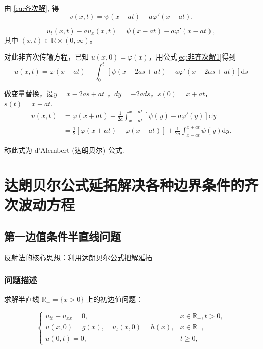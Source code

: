 \documentclass[12pt,a4paper]{article}
\numberwithin{subsection}{section}   %
\numberwithin{subsubsection}{subsection}
\theoremstyle{plain}
\theoremstyle{definition}
\theoremstyle{remark}
\theoremstyle{remark}
\begin{document}
	由 \eqref{eq:齐次解}, 得
	\begin{equation}
		v(x, t) = \psi(x - a t) - a \varphi'(x - a t).
	\end{equation}
	
	\begin{equation}
		u_t(x, t) - a u_x(x, t) = \psi(x - a t) - a \varphi'(x - a t),
	\end{equation}
	其中 \((x, t) \in \mathbb{R} \times (0, \infty)\)。
	
	对此非齐次传输方程，已知 \(u(x, 0) = \varphi(x)\)，用公式\eqref{eq:非齐次解1}得到
	\begin{equation}
			u(x, t) = \varphi(x + a t) + \int_0^t \left[ \psi(x - 2 a s + a t) - a \varphi'(x - 2 a s + a t) \right] \mathrm{d}s 
	\end{equation}
	
	
做变量替换，设$y=x−2as+at$	，$dy=−2ads$，$s(0)=x+at$，$s(t)=x-at$.
	\begin{equation}\label{eq:达朗贝尔公式}
	\begin{aligned}
		u(x, t) &= \varphi(x + a t) + \frac{1}{2 a} \int_{x - a t}^{x + a t} \left[ \psi(y) - a \varphi'(y) \right] \mathrm{d}y \\
		&= \frac{1}{2} \left[ \varphi(x + a t) + \varphi(x - a t) \right] + \frac{1}{2 a} \int_{x - a t}^{x + a t} \psi(y) \mathrm{d}y.
	\end{aligned}
\end{equation}
	
	称此式为 d'Alembert (达朗贝尔) 公式.
	
	
	\newpage
	
	\section{达朗贝尔公式延拓解决各种边界条件的齐次波动方程}
	\subsection{第一边值条件半直线问题}
	反射法的核心思想：利用达朗贝尔公式把解延拓
	
	\subsubsection{问题描述}
	求解半直线 \(\mathbb{R}_+ = \{x > 0\}\) 上的初边值问题：
	
	\begin{equation}
		\begin{cases}
			u_{tt} - u_{xx} = 0, & x \in \mathbb{R}_+, t > 0, \\
			u(x, 0) = g(x), \quad u_t(x, 0) = h(x), & x \in \mathbb{R}_+, \\
			u(0, t) = 0, & t \geq 0,
		\end{cases}
	\end{equation}
	
\end{document}
